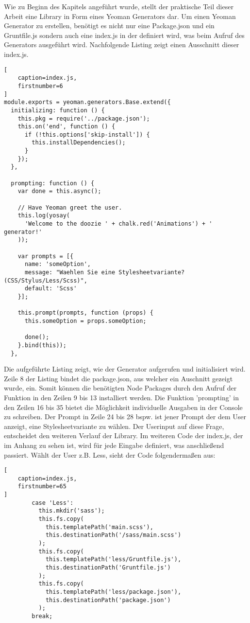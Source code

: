 Wie zu Beginn des Kapitels angeführt wurde, stellt der praktische Teil dieser Arbeit eine Library in Form eines Yeoman Generators dar. Um einen Yeoman Generator zu erstellen, benötigt es nicht nur eine Package.json und ein Gruntfile.js sondern auch eine index.js in der definiert wird, was beim Aufruf des Generators ausgeführt wird. Nachfolgende Listing zeigt einen Ausschnitt dieser index.js.
\begin{lstlisting}[
	caption=index.js,
	firstnumber=6
]
module.exports = yeoman.generators.Base.extend({
  initializing: function () {
    this.pkg = require('../package.json');
    this.on('end', function () {
      if (!this.options['skip-install']) {
        this.installDependencies();
      }
    });
  },

  prompting: function () {
    var done = this.async();

    // Have Yeoman greet the user.
    this.log(yosay(
      'Welcome to the doozie ' + chalk.red('Animations') + ' generator!'
    ));

    var prompts = [{
      name: 'someOption',
      message: "Waehlen Sie eine Stylesheetvariante? (CSS/Stylus/Less/Scss)",
      default: 'Scss'
    }];

    this.prompt(prompts, function (props) {
      this.someOption = props.someOption;

      done();
    }.bind(this));
  },
\end{lstlisting}
Die aufgeführte Listing zeigt, wie der Generator aufgerufen und initialisiert wird. Zeile 8 der Listing bindet die package.json, aus welcher ein Auschnitt gezeigt wurde, ein.\newline
Somit können die benötigten Node Packages durch den Aufruf der Funktion in den Zeilen 9 bis 13 installiert werden.\newline
Die Funktion 'prompting' in den Zeilen 16 bis 35 bietet die Möglichkeit individuelle Ausgaben in der Console zu schreiben. Der Prompt in Zeile 24 bis 28 bspw. ist jener Prompt der dem User anzeigt, eine Stylesheetvariante zu wählen. Der Userinput auf diese Frage, entscheidet den weiteren Verlauf der Library. Im weiteren Code der index.js, der im Anhang zu sehen ist, wird für jede Eingabe definiert, was anschließend passiert. Wählt der User z.B. Less, sieht der Code folgendermaßen aus:
\begin{lstlisting}[
	caption=index.js,
	firstnumber=65
]
        case 'Less':
          this.mkdir('sass');
          this.fs.copy(
            this.templatePath('main.scss'),
            this.destinationPath('/sass/main.scss')
          );
          this.fs.copy(
            this.templatePath('less/Gruntfile.js'),
            this.destinationPath('Gruntfile.js')
          );
          this.fs.copy(
            this.templatePath('less/package.json'),
            this.destinationPath('package.json')
          );
        break;
\end{lstlisting}
